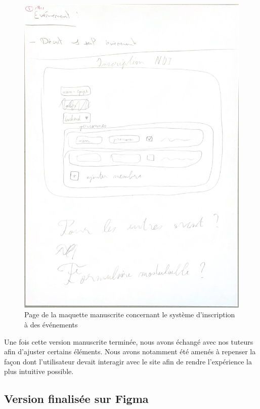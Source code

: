\begin{figure}[H]
    \centering
    \includegraphics[scale=0.5]{assets/pictures/maquette-inscription.pdf}
    \captionsetup{justification=centering}
    \caption{Page de la maquette manuscrite concernant le système d'inscription à des événements}
    \label{fig:enter-label}
\end{figure}


Une fois cette version manuscrite terminée, nous avons échangé avec nos tuteurs afin d’ajuster certains éléments.
Nous avons notamment été amenés à repenser la façon dont l'utilisateur devait interagir avec le site afin de rendre l'expérience la plus intuitive possible.

\subsection{Version finalisée sur Figma}

